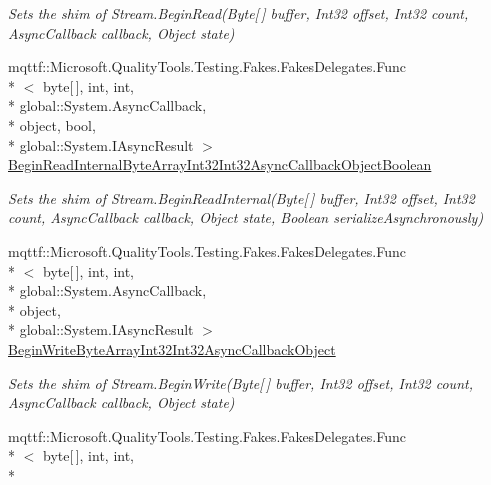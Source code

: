 \begin{DoxyCompactItemize}
\begin{DoxyCompactList}\small\item\em Sets the shim of Stream.\-Begin\-Read(\-Byte\mbox{[}$\,$\mbox{]} buffer, Int32 offset, Int32 count, Async\-Callback callback, Object state)\end{DoxyCompactList}\item 
mqttf\-::\-Microsoft.\-Quality\-Tools.\-Testing.\-Fakes.\-Fakes\-Delegates.\-Func\\*
$<$ byte\mbox{[}$\,$\mbox{]}, int, int, \\*
global\-::\-System.\-Async\-Callback, \\*
object, bool, \\*
global\-::\-System.\-I\-Async\-Result $>$ \hyperlink{class_system_1_1_i_o_1_1_fakes_1_1_shim_stream_a0f13d5f4936dc7cf365d36056ac9e73c}{Begin\-Read\-Internal\-Byte\-Array\-Int32\-Int32\-Async\-Callback\-Object\-Boolean}
\begin{DoxyCompactList}\small\item\em Sets the shim of Stream.\-Begin\-Read\-Internal(\-Byte\mbox{[}$\,$\mbox{]} buffer, Int32 offset, Int32 count, Async\-Callback callback, Object state, Boolean serialize\-Asynchronously)\end{DoxyCompactList}\item 
mqttf\-::\-Microsoft.\-Quality\-Tools.\-Testing.\-Fakes.\-Fakes\-Delegates.\-Func\\*
$<$ byte\mbox{[}$\,$\mbox{]}, int, int, \\*
global\-::\-System.\-Async\-Callback, \\*
object, \\*
global\-::\-System.\-I\-Async\-Result $>$ \hyperlink{class_system_1_1_i_o_1_1_fakes_1_1_shim_stream_a012bc266f7e28551a044b4eef7c9d187}{Begin\-Write\-Byte\-Array\-Int32\-Int32\-Async\-Callback\-Object}
\begin{DoxyCompactList}\small\item\em Sets the shim of Stream.\-Begin\-Write(\-Byte\mbox{[}$\,$\mbox{]} buffer, Int32 offset, Int32 count, Async\-Callback callback, Object state)\end{DoxyCompactList}\item 
mqttf\-::\-Microsoft.\-Quality\-Tools.\-Testing.\-Fakes.\-Fakes\-Delegates.\-Func\\*
$<$ byte\mbox{[}$\,$\mbox{]}, int, int, \\*

\end{DoxyCompactItemize}
